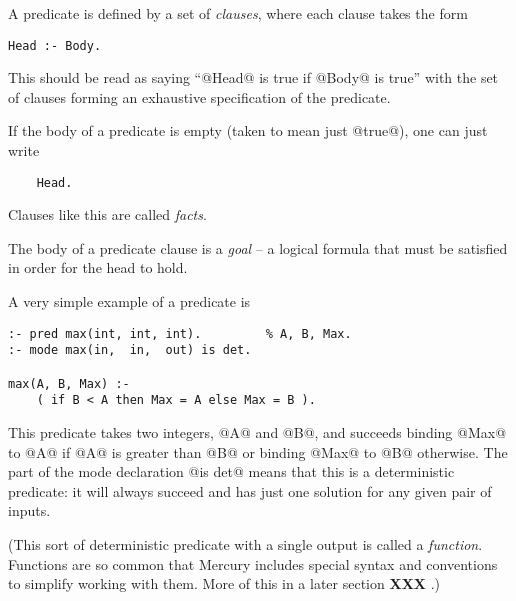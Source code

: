 \documentclass[a4paper,11pt,notitlepage,onecolumn]{article}
\newcommand{\XXX}[1]%
{{\small\textbf{XXX} \emph{#1}}}
\begin{document}
A predicate is defined by a set of \emph{clauses}, where each
clause takes the form
\begin{verbatim}
Head :- Body.
\end{verbatim}
This should be read as saying ``@Head@ is true if @Body@ is true'' with
the set of clauses forming an exhaustive specification of the
predicate.

If the body of a predicate is empty (taken to mean just @true@), one can
just write
\begin{verbatim}
    Head.
\end{verbatim}
Clauses like this are called \emph{facts}.

The body of a predicate clause is a \emph{goal} -- a logical formula
that must be satisfied in order for the head to hold.

A very simple example of a predicate is
\begin{verbatim}
:- pred max(int, int, int).         % A, B, Max.
:- mode max(in,  in,  out) is det.

max(A, B, Max) :-
    ( if B < A then Max = A else Max = B ).
\end{verbatim}
This predicate takes two integers, @A@ and @B@, and succeeds
binding @Max@ to @A@ if @A@ is greater than @B@ or binding @Max@ to @B@
otherwise.  The part of the mode declaration @is det@ means
that this is a deterministic predicate: it will always succeed
and has just one solution for any given pair of inputs.

(This sort of deterministic predicate with a single output is
called a \emph{function}.  Functions are so common that Mercury
includes special syntax and conventions to simplify working
with them.  More of this in a later section \XXX{}.)
\end{document}
